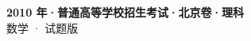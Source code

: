 \documentclass[zihao=-4, a4paper]{ctexart}
\begin{document}
\begin{center}
  {\Large\bfseries 2010 年·普通高等学校招生考试·北京卷·理科}\\[4pt]
  {\large 数学 · 试题版}
\end{center}
\medskip
{}

\end{document}
